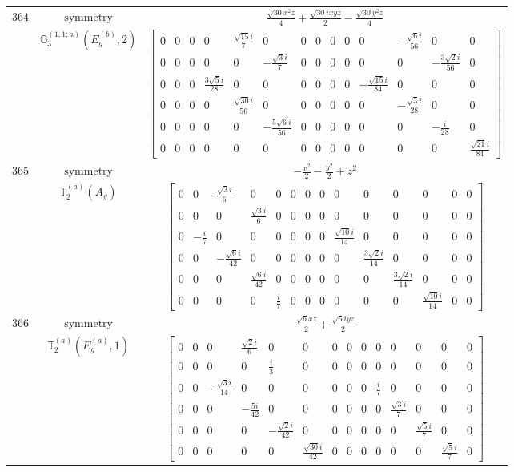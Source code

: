\documentclass[fleqn,8pt,landscape]{jsarticle}
\begin{document}
\begin{longtable}{ccc}
$ 364 $ & $ \text{symmetry} $ & $ \frac{\sqrt{30} x^{2} z}{4} + \frac{\sqrt{30} i x y z}{2} - \frac{\sqrt{30} y^{2} z}{4} $ \\
$  $ & $ \mathbb{G}_{3}^{(1,1;a)}(E_{g}^{(b)},2) $ & $ \begin{bmatrix} 0 & 0 & 0 & 0 & \frac{\sqrt{15} i}{7} & 0 & 0 & 0 & 0 & 0 & 0 & - \frac{\sqrt{6} i}{56} & 0 & 0 \\ 0 & 0 & 0 & 0 & 0 & - \frac{\sqrt{3} i}{7} & 0 & 0 & 0 & 0 & 0 & 0 & - \frac{3 \sqrt{2} i}{56} & 0 \\ 0 & 0 & 0 & \frac{3 \sqrt{5} i}{28} & 0 & 0 & 0 & 0 & 0 & 0 & - \frac{\sqrt{15} i}{84} & 0 & 0 & 0 \\ 0 & 0 & 0 & 0 & \frac{\sqrt{30} i}{56} & 0 & 0 & 0 & 0 & 0 & 0 & - \frac{\sqrt{3} i}{28} & 0 & 0 \\ 0 & 0 & 0 & 0 & 0 & - \frac{5 \sqrt{6} i}{56} & 0 & 0 & 0 & 0 & 0 & 0 & - \frac{i}{28} & 0 \\ 0 & 0 & 0 & 0 & 0 & 0 & 0 & 0 & 0 & 0 & 0 & 0 & 0 & \frac{\sqrt{21} i}{84} \end{bmatrix} $ \\ \hline
$ 365 $ & $ \text{symmetry} $ & $ - \frac{x^{2}}{2} - \frac{y^{2}}{2} + z^{2} $ \\
$  $ & $ \mathbb{T}_{2}^{(a)}(A_{g}) $ & $ \begin{bmatrix} 0 & 0 & \frac{\sqrt{3} i}{6} & 0 & 0 & 0 & 0 & 0 & 0 & 0 & 0 & 0 & 0 & 0 \\ 0 & 0 & 0 & \frac{\sqrt{3} i}{6} & 0 & 0 & 0 & 0 & 0 & 0 & 0 & 0 & 0 & 0 \\ 0 & - \frac{i}{7} & 0 & 0 & 0 & 0 & 0 & 0 & \frac{\sqrt{10} i}{14} & 0 & 0 & 0 & 0 & 0 \\ 0 & 0 & - \frac{\sqrt{6} i}{42} & 0 & 0 & 0 & 0 & 0 & 0 & \frac{3 \sqrt{2} i}{14} & 0 & 0 & 0 & 0 \\ 0 & 0 & 0 & \frac{\sqrt{6} i}{42} & 0 & 0 & 0 & 0 & 0 & 0 & \frac{3 \sqrt{2} i}{14} & 0 & 0 & 0 \\ 0 & 0 & 0 & 0 & \frac{i}{7} & 0 & 0 & 0 & 0 & 0 & 0 & \frac{\sqrt{10} i}{14} & 0 & 0 \end{bmatrix} $ \\ \hline
$ 366 $ & $ \text{symmetry} $ & $ \frac{\sqrt{6} x z}{2} + \frac{\sqrt{6} i y z}{2} $ \\
$  $ & $ \mathbb{T}_{2}^{(a)}(E_{g}^{(a)},1) $ & $ \begin{bmatrix} 0 & 0 & 0 & \frac{\sqrt{2} i}{6} & 0 & 0 & 0 & 0 & 0 & 0 & 0 & 0 & 0 & 0 \\ 0 & 0 & 0 & 0 & \frac{i}{3} & 0 & 0 & 0 & 0 & 0 & 0 & 0 & 0 & 0 \\ 0 & 0 & - \frac{\sqrt{3} i}{14} & 0 & 0 & 0 & 0 & 0 & 0 & \frac{i}{7} & 0 & 0 & 0 & 0 \\ 0 & 0 & 0 & - \frac{5 i}{42} & 0 & 0 & 0 & 0 & 0 & 0 & \frac{\sqrt{3} i}{7} & 0 & 0 & 0 \\ 0 & 0 & 0 & 0 & - \frac{\sqrt{2} i}{42} & 0 & 0 & 0 & 0 & 0 & 0 & \frac{\sqrt{5} i}{7} & 0 & 0 \\ 0 & 0 & 0 & 0 & 0 & \frac{\sqrt{30} i}{42} & 0 & 0 & 0 & 0 & 0 & 0 & \frac{\sqrt{5} i}{7} & 0 \end{bmatrix} $ \\ \hline

\end{longtable}
\end{document}
